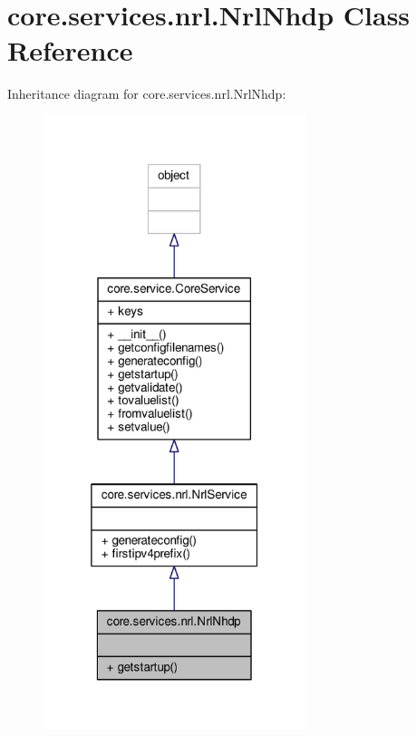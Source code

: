 \hypertarget{classcore_1_1services_1_1nrl_1_1_nrl_nhdp}{\section{core.\+services.\+nrl.\+Nrl\+Nhdp Class Reference}
\label{classcore_1_1services_1_1nrl_1_1_nrl_nhdp}
}


Inheritance diagram for core.\+services.\+nrl.\+Nrl\+Nhdp\+:
\nopagebreak
\begin{figure}[H]
\begin{center}
\leavevmode
\includegraphics[width=217pt]{classcore_1_1services_1_1nrl_1_1_nrl_nhdp__inherit__graph}
\end{center}
\end{figure}



